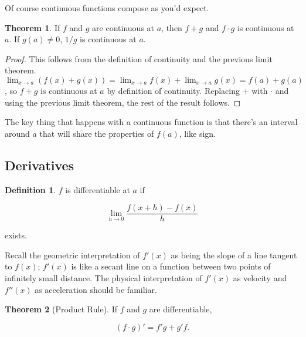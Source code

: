 \documentclass{article}
\theoremstyle{definition}
\newtheorem{definition}{Definition}
\newtheorem{theorem}{Theorem}
\begin{document}
Of course continuous functions compose as you'd expect.

\begin{theorem}

If $f$ and $g$ are continuous at $a$, then $f+g$ and $f \cdot g$ is continuous
at $a$. If $g(a) \neq 0$, $1/g$ is continuous at $a$.

\end{theorem}

\begin{proof}

This follows from the definition of continuity and the previous limit
theorem. $\lim_{x \to a} (f(x) + g(x)) = \lim_{x \to a} f(x) + \lim_{x \to a}
g(x) = f(a) + g(a)$, so $f + g$ is continuous at $a$ by definition of
continuity. Replacing $+$ with $\cdot$ and using the previous limit theorem, the
rest of the result follows.

\end{proof}

The key thing that happens with a continuous function is that there's an
interval around $a$ that will share the properties of $f(a)$, like sign.

\subsection{Derivatives}

\begin{definition} 
$f$ is differentiable at $a$ if

\begin{equation}
\lim_{h \to 0} \frac{f(x+h) - f(x)}{h}
\end{equation}

exists.
\end{definition}

Recall the geometric interpretation of $f'(x)$ as being the slope of a line
tangent to $f(x)$; $f'(x)$ is like a secant line on a function between two
points of infinitely small distance. The physical interpretation of $f'(x)$ as
velocity and $f''(x)$ as acceleration should be familiar.

\begin{theorem}[Product Rule] 

If $f$ and $g$ are differentiable, 

\begin{equation}
(f \cdot g)' = f'g + g'f.
\end{equation}


\end{theorem} 
\end{document}
